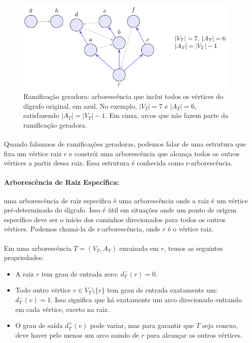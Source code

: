\documentclass[12pt,a4paper]{article}
\def\emph#1{#1}%
\begin{document}
\begin{figure}[H]
    \centering
    \includegraphics[width=0.9\linewidth]{figures/fig_ramificacao_geradora.pdf}

    \caption{Ramificação geradora: arborescência que inclui todos os vértices do dígrafo original, em azul. No exemplo, $|V_T|=7$ e $|A_T|=6$, satisfazendo $|A_T|=|V_T|-1$. Em cinza, arcos que não fazem parte da ramificação geradora.}
    \label{fig:ramificacao-geradora}\end{figure}


\paragraph{}
Quando falamaos de ramificações geradoras, podemos falar de uma estrutura que fixa um vértice raiz \(r\) e constrói uma arborescência que alcança todos os outros vértices a partir dessa raiz. Essa estrutura é conhecida como \emph{r-arborescência}.

\paragraph{Arborescência de Raiz Específica:}
uma arborescência de raiz específica é uma arborescência onde a raiz é um vértice pré-determinado do dígrafo. Isso é útil em situações onde um ponto de origem específico deve ser o início dos caminhos direcionados para todos os outros vértices. Podemos chamá-la de r-arborescência, onde \(r\) é o vértice raiz.

\paragraph{}
Em uma arborescência \(T = (V_T, A_T)\) enraizada em \(r\), temos as seguintes propriedades:
\begin{itemize}
    \item A raiz \(r\) tem grau de entrada zero: \(d_T^-(r) = 0\).
    \item Todo outro vértice \(v \in V_T \setminus \{r\}\) tem grau de entrada exatamente um: \(d_T^-(v) = 1\). Isso significa que há exatamente um arco direcionado entrando em cada vértice, exceto na raiz.
    \item O grau de saída \(d_T^+(v)\) pode variar, mas para garantir que \(T\) seja conexo, deve haver pelo menos um arco saindo de \(r\) para alcançar os outros vértices.
\end{itemize}
\end{document}
